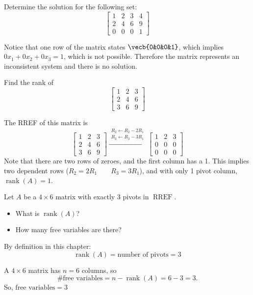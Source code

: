 \begin{Exercise}[title=Augmented Matrices 3, label=nosol]
Determine the solution for the following set:
$$\begin{bmatrix}
1&2&3&4\\
2&4&6&9\\
0&0&0&1
\end{bmatrix}$$
\end{Exercise}
\begin{Answer}[ref=nosol]
Notice that one row of the matrix states $\vecb{0&0&0&1}$, which implies $0x_1 + 0x_2+0x_3=1$, which is not possible. Therefore the matrix represents an inconsistent system and there is no solution.
\end{Answer}
\begin{Exercise}[title=Rank 1, label=rank1]
Find the rank of
$$\begin{bmatrix}
1&2&3\\
2&4&6\\
3&6&9
\end{bmatrix}$$
\end{Exercise}
\begin{Answer}[ref=rank1]
The RREF of this matrix is
$$\begin{bmatrix}
1&2&3\\
2&4&6\\
3&6&9
\end{bmatrix}
\xrightarrow{\substack{R_2\leftarrow R_2-2R_1\\ R_3\leftarrow R_3-3R_1}}
\begin{bmatrix}
1&2&3\\
0&0&0\\
0&0&0
\end{bmatrix}$$
Note that there are two rows of zeroes, and the first column has a 1. This implies two dependent rows ($R_2 = 2 R_1 \qquad R_3 = 3 R_1$), and with only 1 pivot column, $\operatorname{rank}(A)=1$. 
\end{Answer}

\begin{Exercise}[title=Rank 2,label=rank2]
Let $A$ be a $4\times 6$ matrix with exactly $3$ pivots in $\operatorname{RREF}$.
\begin{itemize}
       \item What is $\operatorname{rank}(A)$?
       \item How many free variables are there?
\end{itemize}
\end{Exercise}
\begin{Answer}[ref=rank2]
By definition in this chapter:
$$\operatorname{rank}(A)=\text{number of pivots}=3$$

A $4 \times 6$ matrix has $n=6$ columns, so 
$$\text{\# free variables} = n-\operatorname{rank}(A)=6-3=3.$$
So, $\text{free variables} = 3$
\end{Answer}

